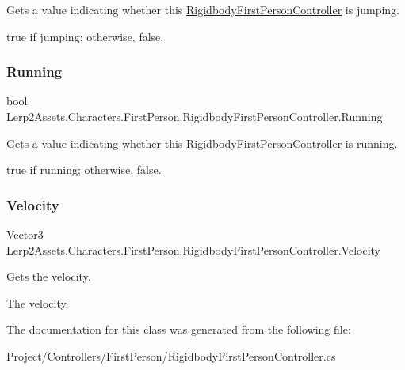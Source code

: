 Gets a value indicating whether this \hyperlink{class_lerp2_assets_1_1_characters_1_1_first_person_1_1_rigidbody_first_person_controller}{Rigidbody\+First\+Person\+Controller} is jumping. 

{\ttfamily true} if jumping; otherwise, {\ttfamily false}.\mbox{\label{class_lerp2_assets_1_1_characters_1_1_first_person_1_1_rigidbody_first_person_controller_a4a538e6fa034a9635cbddf3c9e810346}} 
\subsubsection{\texorpdfstring{Running}{Running}}
{\footnotesize\ttfamily bool Lerp2\+Assets.\+Characters.\+First\+Person.\+Rigidbody\+First\+Person\+Controller.\+Running\hspace{0.3cm}{\ttfamily [get]}}



Gets a value indicating whether this \hyperlink{class_lerp2_assets_1_1_characters_1_1_first_person_1_1_rigidbody_first_person_controller}{Rigidbody\+First\+Person\+Controller} is running. 

{\ttfamily true} if running; otherwise, {\ttfamily false}.\mbox{\label{class_lerp2_assets_1_1_characters_1_1_first_person_1_1_rigidbody_first_person_controller_ae4fabb355685ddf4e99bea4395e258ad}} 
\subsubsection{\texorpdfstring{Velocity}{Velocity}}
{\footnotesize\ttfamily Vector3 Lerp2\+Assets.\+Characters.\+First\+Person.\+Rigidbody\+First\+Person\+Controller.\+Velocity\hspace{0.3cm}{\ttfamily [get]}}



Gets the velocity. 

The velocity.

The documentation for this class was generated from the following file\+:\begin{DoxyCompactItemize}
\item 
Project/\+Controllers/\+First\+Person/Rigidbody\+First\+Person\+Controller.\+cs\end{DoxyCompactItemize}
